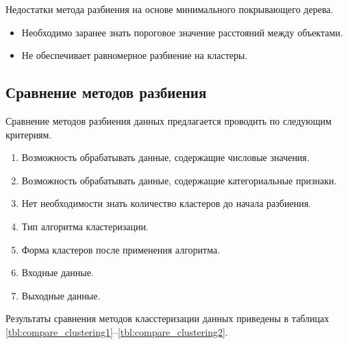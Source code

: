 Недостатки метода разбиения на основе минимального покрывающего дерева.

\begin{itemize}
    \item Необходимо заранее знать пороговое значение расстояний между объектами.
    \item Не обеспечивает равномерное разбиение на кластеры.
\end{itemize}


\subsection{Сравнение методов разбиения}

Сравнение методов разбиения данных предлагается проводить по следующим критериям.

\begin{enumerate}
    \item Возможность обрабатывать данные, содержащие числовые значения.
    \item Возможность обрабатывать данные, содержащие категориальные признаки.
    \item Нет необходимости знать количество кластеров до начала разбиения.
    \item Тип алгоритма кластеризации.
    \item Форма кластеров после применения алгоритма.
    \item Входные данные.
    \item Выходные данные.
\end{enumerate}

\clearpage
Результаты сравнения методов класстеризации данных приведены в таблицах \ref{tbl:compare_clustering1}--\ref{tbl:compare_clustering2}.

